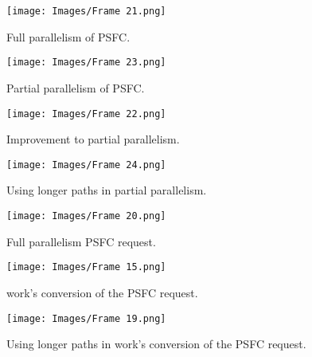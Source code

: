 \documentclass[journal]{IEEEtran}
\begin{document}
\begin{figure}[t]
\centering
\texttt{[image: Images/Frame 21.png]}
\caption{Full parallelism of PSFC.}
\label{Fig 1}
\vspace{0.4cm}
\end{figure}

\begin{figure}[!htb]
\centering
\texttt{[image: Images/Frame 23.png]}
\caption{Partial parallelism of PSFC.}
\label{Fig 2}
\vspace{0.3cm}
\end{figure}

\begin{figure}[!htb]
\centering
\texttt{[image: Images/Frame 22.png]}
\caption{Improvement to partial parallelism.}
\label{Fig 3}
\vspace{0.3cm}
\end{figure}

\begin{figure}[!htb]
\centering
\texttt{[image: Images/Frame 24.png]}
\caption{Using longer paths in partial parallelism.}
\label{Fig 4}
\vspace{0.3cm}
\end{figure}

\begin{figure}[!htb]
\centering
\texttt{[image: Images/Frame 20.png]}
\caption{Full parallelism PSFC request.}
\label{Fig 5}
\vspace{0.3cm}
\end{figure}

\begin{figure}[!htb]
\centering
\texttt{[image: Images/Frame 15.png]}
\caption{\cite{appm} work's conversion of the PSFC request.}
\label{Fig 6}
\vspace{0.3cm}
\end{figure}

\begin{figure}[!htb]
\centering
\texttt{[image: Images/Frame 19.png]}
\caption{Using longer paths in \cite{appm} work's conversion of the PSFC request.}
\label{Fig 7}
\vspace{0.5cm}
\end{figure}
\end{document}
